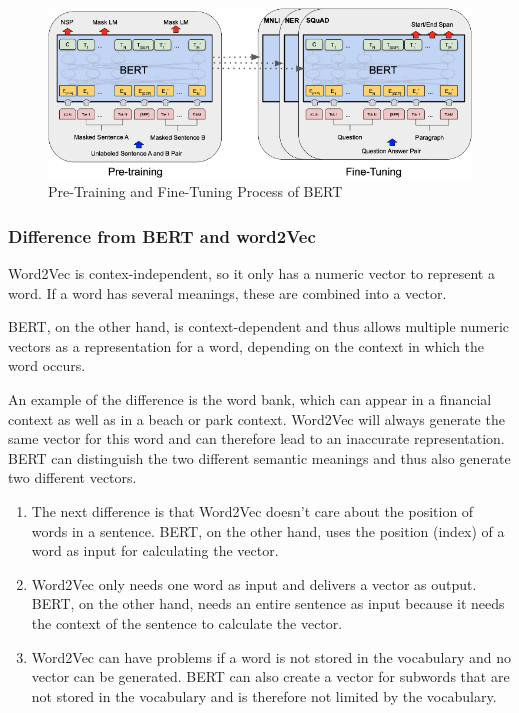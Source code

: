 \begin{figure}[H]
	\centering
	\includegraphics[width=1\textwidth]{figures/bert_training.png}
	\caption{Pre-Training and Fine-Tuning Process of BERT}
	\label{fig:bert_tokenizing}
\end{figure}

\subsubsection{Difference from BERT and word2Vec}
Word2Vec is contex-independent, so it only has a numeric vector to represent a word. If a word has several meanings, these are combined into a vector.

BERT, on the other hand, is context-dependent and thus allows multiple numeric vectors as a representation for a word, depending on the context in which the word occurs.

An example of the difference is the word bank, which can appear in a financial context as well as in a beach or park context. Word2Vec will always generate the same vector for this word and can therefore lead to an inaccurate representation. BERT can distinguish the two different semantic meanings and thus also generate two different vectors.

\begin{enumerate}
	\item The next difference is that Word2Vec doesn't care about the position of words in a sentence. BERT, on the other hand, uses the position (index) of a word as input for calculating the vector.
	\item Word2Vec only needs one word as input and delivers a vector as output. BERT, on the other hand, needs an entire sentence as input because it needs the context of the sentence to calculate the vector.
	\item Word2Vec can have problems if a word is not stored in the vocabulary and no vector can be generated. BERT can also create a vector for subwords that are not stored in the vocabulary and is therefore not limited by the vocabulary.
\end{enumerate}

